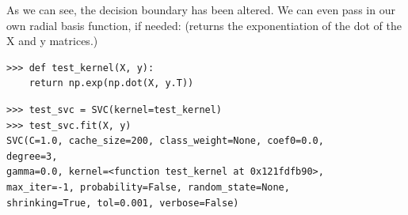 \documentclass[SKL-MASTER.tex]{subfiles}
\begin{document}
As we can see, the decision boundary has been altered. We can even pass in our own radial
basis function, if needed:
(returns the exponentiation 
of the dot of the
X and y matrices.)
\begin{framed}
	\begin{verbatim}
>>> def test_kernel(X, y):
    return np.exp(np.dot(X, y.T))
\end{verbatim}
\end{framed}
\begin{framed}
	\begin{verbatim}
>>> test_svc = SVC(kernel=test_kernel)
>>> test_svc.fit(X, y)
SVC(C=1.0, cache_size=200, class_weight=None, coef0=0.0, 
degree=3,
gamma=0.0, kernel=<function test_kernel at 0x121fdfb90>,
max_iter=-1, probability=False, random_state=None,
shrinking=True, tol=0.001, verbose=False)

\end{verbatim}
\end{framed}
\end{document}
